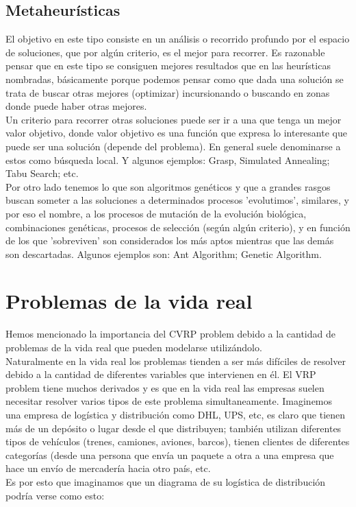 \documentclass[11pt,a4paper]{article}
\begin{document}
\subsection{Metaheurísticas}
El objetivo en este tipo consiste en un análisis o recorrido profundo por el espacio de soluciones, que por algún criterio, es el mejor para recorrer. Es razonable pensar que en este tipo se consiguen mejores resultados que en las heurísticas nombradas, básicamente porque podemos pensar como que dada una solución  se trata de buscar otras mejores (optimizar) incursionando o buscando en zonas donde puede haber otras mejores.\\
Un criterio para recorrer otras soluciones puede ser ir a una que tenga un mejor valor objetivo, donde valor objetivo es una función que expresa lo interesante que puede ser una solución (depende del problema). En general suele denominarse a estos como búsqueda local. Y algunos ejemplos: Grasp,  Simulated Annealing; Tabu Search; etc.
\\
Por otro lado tenemos lo que son algoritmos genéticos y que a grandes rasgos buscan someter a las soluciones a determinados procesos 'evolutimos', similares, y por eso el nombre, a los procesos de mutación de la evolución biológica, combinaciones genéticas, procesos de selección (según algún criterio), y en función de los que 'sobreviven' son considerados los más aptos mientras que las demás son descartadas. Algunos ejemplos son: Ant Algorithm; Genetic Algorithm.



\section{Problemas de la vida real}
Hemos mencionado la importancia del CVRP problem debido a la cantidad de problemas de la vida real que pueden modelarse utilizándolo.\\
Naturalmente en la vida real los problemas tienden a ser más difíciles de resolver debido a la cantidad de diferentes variables que intervienen en él. El VRP problem tiene muchos derivados y es que en la vida real las empresas suelen necesitar resolver varios tipos de este problema simultaneamente. Imaginemos una empresa de logística y distribución como DHL, UPS, etc, es claro que tienen más de un depósito o lugar desde el que distribuyen; también utilizan diferentes tipos de vehículos (trenes, camiones, aviones, barcos), tienen clientes de diferentes categorías (desde una persona que envía un paquete a otra a una empresa que hace un envío de mercadería hacia otro país, etc. \\ Es por esto que imaginamos que un diagrama de su logística de distribución podría verse como esto:
\end{document}

